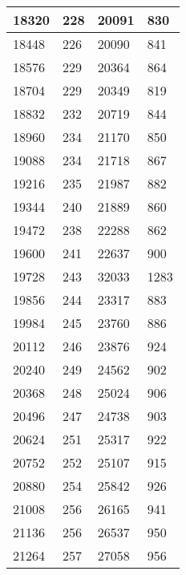 \begin{longtable}{|l|l|l|l|}
		18320 & 228         & 20091           & 830              \\ \hline
		18448 & 226         & 20090           & 841              \\ \hline
		18576 & 229         & 20364           & 864              \\ \hline
		18704 & 229         & 20349           & 819              \\ \hline
		18832 & 232         & 20719           & 844              \\ \hline
		18960 & 234         & 21170           & 850              \\ \hline
		19088 & 234         & 21718           & 867              \\ \hline
		19216 & 235         & 21987           & 882              \\ \hline
		19344 & 240         & 21889           & 860              \\ \hline
		19472 & 238         & 22288           & 862              \\ \hline
		19600 & 241         & 22637           & 900              \\ \hline
		19728 & 243         & 32033           & 1283             \\ \hline
		19856 & 244         & 23317           & 883              \\ \hline
		19984 & 245         & 23760           & 886              \\ \hline
		20112 & 246         & 23876           & 924              \\ \hline
		20240 & 249         & 24562           & 902              \\ \hline
		20368 & 248         & 25024           & 906              \\ \hline
		20496 & 247         & 24738           & 903              \\ \hline
		20624 & 251         & 25317           & 922              \\ \hline
		20752 & 252         & 25107           & 915              \\ \hline
		20880 & 254         & 25842           & 926              \\ \hline
		21008 & 256         & 26165           & 941              \\ \hline
		21136 & 256         & 26537           & 950              \\ \hline
		21264 & 257         & 27058           & 956              \\ \hline

\end{longtable}
